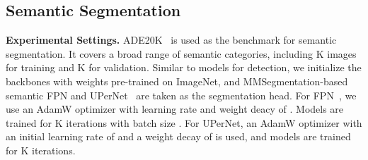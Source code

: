 \documentclass{article} \usepackage{iclr2022_conference,times}
\begin{document}
\vspace{-2mm}
\subsection{Semantic Segmentation}
\vspace{-1mm}

\textbf{Experimental Settings.} ADE20K~\citep{DBLP:conf/cvpr/ZhouZPFB017} is used as the benchmark for semantic segmentation. It covers a broad range of  semantic categories, including K images for training and K for validation. Similar to models for detection, we initialize the backbones with weights pre-trained on ImageNet, and MMSegmentation-based~\citep{mmseg2020} semantic FPN and UPerNet~\citep{DBLP:conf/eccv/XiaoLZJS18} are taken as the segmentation head. For FPN~\citep{DBLP:conf/cvpr/KirillovGHD19}, we use an AdamW optimizer with learning rate and weight deacy of . Models are trained for K iterations with batch size . For UPerNet, an AdamW optimizer with an initial learning rate of  and a weight decay of  is used, and models are trained for K iterations. 
\end{document}
